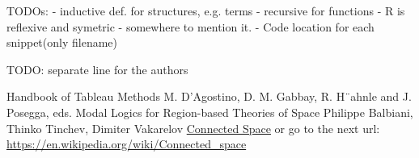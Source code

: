 \documentclass{article}
\begin{document}
	TODOs:
	 - inductive def. for structures, e.g. terms
	 - recursive for functions
	 - R is reflexive and symetric - somewhere to mention it.
	 - Code location for each snippet(only filename)
	\fi

	\newpage
	TODO: separate line for the authors
	\begin{thebibliography}{9}
			Handbook of Tableau Methods
			M. D’Agostino, D. M. Gabbay, R. H¨ahnle and J. Posegga, eds.
			Modal Logics for Region-based Theories of Space
			Philippe Balbiani, Thinko Tinchev, Dimiter Vakarelov
			\href{https://en.wikipedia.org/wiki/Connected_space}{Connected Space}
			or go to the next url: \url{https://en.wikipedia.org/wiki/Connected_space}
	\end{thebibliography}
\end{document}
